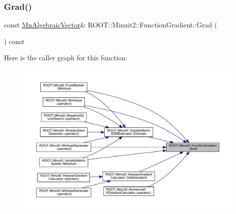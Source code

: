 \mbox{\label{classROOT_1_1Minuit2_1_1FunctionGradient_a0effb8dbe0115928f72f122621ba4ad3}} 
\subsubsection{\texorpdfstring{Grad()}{Grad()}\hspace{0.1cm}{\footnotesize\ttfamily [2/2]}}
{\footnotesize\ttfamily const \mbox{\hyperlink{namespaceROOT_1_1Minuit2_a62ed97730a1ca8d3fbaec64a19aa11c9}{Mn\+Algebraic\+Vector}}\& R\+O\+O\+T\+::\+Minuit2\+::\+Function\+Gradient\+::\+Grad (\begin{DoxyParamCaption}{ }\end{DoxyParamCaption}) const\hspace{0.3cm}{\ttfamily [inline]}}

Here is the caller graph for this function\+:\nopagebreak
\begin{figure}[H]
\begin{center}
\leavevmode
\includegraphics[width=350pt]{d3/d48/classROOT_1_1Minuit2_1_1FunctionGradient_a0effb8dbe0115928f72f122621ba4ad3_icgraph}
\end{center}
\end{figure}
\mbox{\label{classROOT_1_1Minuit2_1_1FunctionGradient_a09cf6f34997cef2cffca0d9ccc2b36b8}} 
